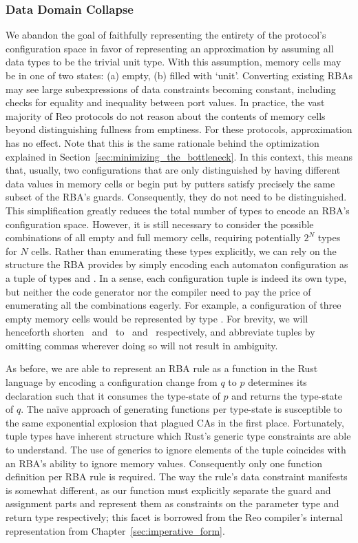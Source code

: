 \subsubsection{Data Domain Collapse}
\label{sec:approximating_rba}
We abandon the goal of faithfully representing the entirety of the protocol's configuration space in favor of representing an approximation by assuming all data types to be the trivial unit type. With this assumption, memory cells may be in one of two states: (a) empty, (b) filled with `unit'. Converting existing RBAs may see large subexpressions of data constraints becoming constant, including checks for equality and inequality between port values. In practice, the vast majority of Reo protocols do not reason about the contents of memory cells beyond distinguishing fullness from emptiness. For these protocols, approximation has no effect. Note that this is the same rationale behind the optimization explained in Section~\ref{sec:minimizing_the_bottleneck}. In this context, this means that, usually, two configurations that are only distinguished by having different data values in memory cells or begin put by putters satisfy precisely the same subset of the RBA's guards. Consequently, they do not need to be distinguished. This simplification greatly reduces the total number of types to encode an RBA's configuration space. However, it is still necessary to consider the possible combinations of all empty and full memory cells, requiring potentially $2^N$ types for $N$ cells. Rather than enumerating these types explicitly, we can rely on the structure the RBA provides by simply encoding each automaton configuration as a tuple of types  and . In a sense, each configuration tuple is indeed its own type, but neither the code generator nor the compiler need to pay the price of enumerating all the combinations eagerly. For example, a configuration of three empty memory cells would be represented by type . For brevity, we will henceforth shorten~ and~ to~ and~ respectively, and abbreviate tuples by omitting commas wherever doing so will not result in ambiguity.


As before, we are able to represent an RBA rule as a function in the Rust language by encoding a configuration change from $q$ to $p$ determines its declaration such that it consumes the type-state of $p$ and returns the type-state of $q$. The na{\"i}ve approach of generating functions per type-state is susceptible to the same exponential explosion that plagued CAs in the first place. Fortunately, tuple types have inherent structure which Rust's generic type constraints are able to understand. The use of generics to ignore elements of the tuple coincides with an RBA's ability to ignore memory values. Consequently only one function definition per RBA rule is required. The way the rule's data constraint manifests is somewhat different, as our function must explicitly separate the guard and assignment parts and represent them as constraints on the parameter type and return type respectively; this facet is borrowed from the Reo compiler's internal representation from Chapter~\ref{sec:imperative_form}.

